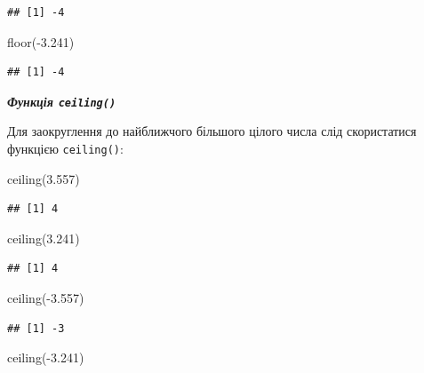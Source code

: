 \documentclass[
]{book}
\newenvironment{Shaded}{\begin{snugshade}}{\end{snugshade}}
\newcommand{\FloatTok}[1]{\textcolor[rgb]{0.00,0.00,0.81}{#1}}
\newcommand{\FunctionTok}[1]{\textcolor[rgb]{0.00,0.00,0.00}{#1}}
\newcommand{\NormalTok}[1]{#1}
\newcommand{\SpecialCharTok}[1]{\textcolor[rgb]{0.00,0.00,0.00}{#1}}
\begin{document}
\begin{verbatim}
## [1] -4
\end{verbatim}

\begin{Shaded}
\begin{Highlighting}[]
\FunctionTok{floor}\NormalTok{(}\SpecialCharTok{{-}}\FloatTok{3.241}\NormalTok{)}
\end{Highlighting}
\end{Shaded}

\begin{verbatim}
## [1] -4
\end{verbatim}

\emph{\textbf{Функція \texttt{ceiling()}}}

Для заокруглення до найближчого більшого цілого числа слід скористатися функцією \texttt{ceiling()}:

\begin{Shaded}
\begin{Highlighting}[]
\FunctionTok{ceiling}\NormalTok{(}\FloatTok{3.557}\NormalTok{)}
\end{Highlighting}
\end{Shaded}

\begin{verbatim}
## [1] 4
\end{verbatim}

\begin{Shaded}
\begin{Highlighting}[]
\FunctionTok{ceiling}\NormalTok{(}\FloatTok{3.241}\NormalTok{)}
\end{Highlighting}
\end{Shaded}

\begin{verbatim}
## [1] 4
\end{verbatim}

\begin{Shaded}
\begin{Highlighting}[]
\FunctionTok{ceiling}\NormalTok{(}\SpecialCharTok{{-}}\FloatTok{3.557}\NormalTok{)}
\end{Highlighting}
\end{Shaded}

\begin{verbatim}
## [1] -3
\end{verbatim}

\begin{Shaded}
\begin{Highlighting}[]
\FunctionTok{ceiling}\NormalTok{(}\SpecialCharTok{{-}}\FloatTok{3.241}\NormalTok{)}
\end{Highlighting}
\end{Shaded}
\end{document}
